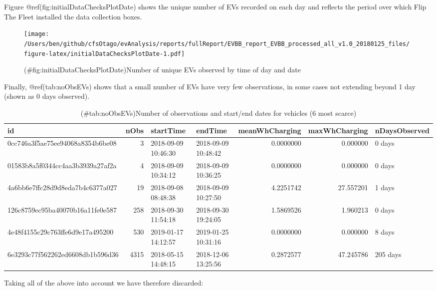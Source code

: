 \documentclass[]{article}
\begin{document}
Figure @ref(fig:initialDataChecksPlotDate) shows the unique number of EVs recorded on each day and reflects the period over which Flip The Fleet installed the data collection boxes.

\begin{figure}
\centering
\texttt{[image: /Users/ben/github/cfsOtago/evAnalysis/reports/fullReport/EVBB\_report\_EVBB\_processed\_all\_v1.0\_20180125\_files/figure-latex/initialDataChecksPlotDate-1.pdf]}
\caption{(\#fig:initialDataChecksPlotDate)Number of unique EVs observed by time of day and date}
\end{figure}

Finally, @ref(tab:noObsEVs) shows that a small number of EVs have very few observations, in some cases not extending beyond 1 day (shown as 0 days observed).

\begin{table}[t]

\caption{(\#tab:noObsEVs)Number of observations and start/end dates for vehicles (6 most scarce)}
\centering
\begin{tabular}{l|r|l|l|r|r|l}
\hline
id & nObs & startTime & endTime & meanWhCharging & maxWhCharging & nDaysObserved\\
\hline
0cc746a3f5ae75ee94068a8354b6be08 & 3 & 2018-09-09 10:46:30 & 2018-09-09 10:48:42 & 0.0000000 & 0.000000 & 0 days\\
\hline
01583b8a5f0344cc4aa3b3939a27af2a & 4 & 2018-09-09 10:34:12 & 2018-09-09 10:36:25 & 0.0000000 & 0.000000 & 0 days\\
\hline
4a6bb6e7ffc28d9d8eda7b4c6377a027 & 19 & 2018-09-08 08:48:38 & 2018-09-09 10:27:50 & 4.2251742 & 27.557201 & 1 days\\
\hline
126c8759ec95ba40070b16a11fe0e587 & 258 & 2018-09-30 11:54:18 & 2018-09-30 19:24:05 & 1.5869526 & 1.960213 & 0 days\\
\hline
4e48f4155c29c763ffe6d9e17a495200 & 530 & 2019-01-17 14:12:57 & 2019-01-25 10:31:16 & 0.0000000 & 0.000000 & 8 days\\
\hline
6e3293c77f562262ed6608db1b596d36 & 4315 & 2018-05-15 14:48:15 & 2018-12-06 13:25:56 & 0.2872577 & 47.245786 & 205 days\\
\hline
\end{tabular}
\end{table}

Taking all of the above into account we have therefore discarded:
\end{document}
